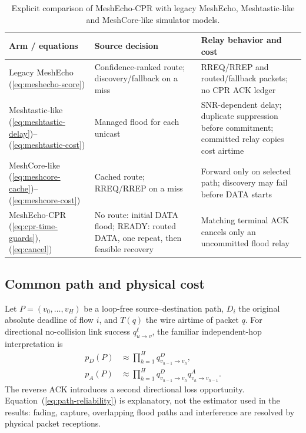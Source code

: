 \documentclass[conference,letterpaper,10pt]{IEEEtran}
\begin{document}
\begin{table}[t]
\centering
\caption{Explicit comparison of MeshEcho-CPR with legacy MeshEcho,
Meshtastic-like and MeshCore-like simulator models.}
\label{tab:protocol-map}
\footnotesize
\setlength{\tabcolsep}{2.5pt}
\begin{tabular}{@{}>{\raggedright\arraybackslash}p{}>{\raggedright\arraybackslash}p{}>{\raggedright\arraybackslash}p{}@{}}
\toprule
Arm / equations & Source decision & Relay behavior and cost\\
\midrule
Legacy MeshEcho (\ref{eq:meshecho-score}) & Confidence-ranked route; discovery/fallback on a miss &
RREQ/RREP and routed/fallback packets; no CPR ACK ledger\\
Meshtastic-like (\ref{eq:meshtastic-delay})--(\ref{eq:meshtastic-cost}) & Managed flood for each unicast &
SNR-dependent delay; duplicate suppression before commitment; committed relay copies cost airtime\\
MeshCore-like (\ref{eq:meshcore-cache})--(\ref{eq:meshcore-cost}) & Cached route; RREQ/RREP on a miss &
Forward only on selected path; discovery may fail before DATA starts\\
MeshEcho-CPR (\ref{eq:cpr-time-guards}), (\ref{eq:cancel}) & No route: initial DATA flood; READY: routed DATA, one repeat, then feasible recovery &
Matching terminal ACK cancels only an uncommitted flood relay\\
\bottomrule
\end{tabular}
\end{table}

\subsection{Common path and physical cost}
Let $P=(v_0,\ldots,v_H)$ be a loop-free source--destination path,
$D_i$ the original absolute deadline of flow $i$, and $T(q)$ the wire airtime
of packet $q$. For directional no-collision link success $q_{u\to v}^{\ell}$,
the familiar independent-hop interpretation is
\begin{equation}
\begin{aligned}
p_D(P)&\approx\prod_{h=1}^{H}q_{v_{h-1}\to v_h}^{D},\\
p_A(P)&\approx\prod_{h=1}^{H}
 q_{v_{h-1}\to v_h}^{D}q_{v_h\to v_{h-1}}^{A}.
\end{aligned}
\label{eq:path-reliability}
\end{equation}
The reverse ACK introduces a second directional loss opportunity.
Equation~(\ref{eq:path-reliability}) is explanatory, not the estimator used
in the results: fading, capture, overlapping flood paths and interference
are resolved by physical packet receptions.
\end{document}
